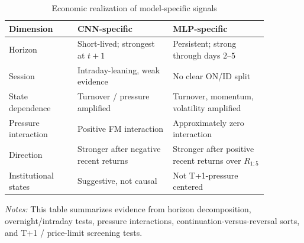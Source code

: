 \begin{table}[htbp]
\centering
\caption{Economic realization of model-specific signals}
\label{tab:mechanism}
\small
\begin{tabular}{p{0.23\linewidth}p{0.32\linewidth}p{0.32\linewidth}}
\toprule
Dimension & CNN-specific & MLP-specific \\
\midrule
Horizon & Short-lived; strongest at $t+1$ & Persistent; strong through days $2$--$5$ \\
Session & Intraday-leaning, weak evidence & No clear ON/ID split \\
State dependence & Turnover / pressure amplified & Turnover, momentum, volatility amplified \\
Pressure interaction & Positive FM interaction & Approximately zero interaction \\
Direction & Stronger after negative recent returns & Stronger after positive recent returns over $R_{1:5}$ \\
Institutional states & Suggestive, not causal & Not T+1-pressure centered \\
\bottomrule
\end{tabular}
\begin{minipage}{0.92\linewidth}
\footnotesize
\textit{Notes:} This table summarizes evidence from horizon decomposition, overnight/intraday tests, pressure interactions, continuation-versus-reversal sorts, and T+1 / price-limit screening tests.
\end{minipage}
\end{table}
